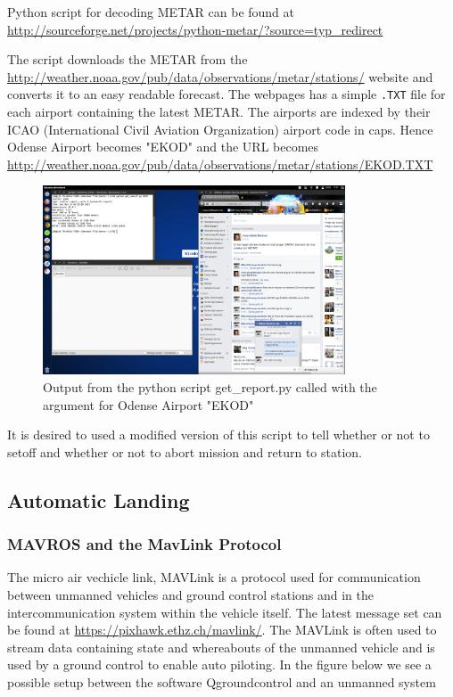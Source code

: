 Python script for decoding METAR can be found at \url{http://sourceforge.net/projects/python-metar/?source=typ_redirect}

The script downloads the METAR from the \url{http://weather.noaa.gov/pub/data/observations/metar/stations/} website and converts it to an easy readable forecast. The webpages has a simple \verb|.TXT| file for each airport containing the latest METAR. The airports are indexed by their ICAO (International Civil Aviation Organization) airport code in caps. Hence Odense Airport becomes "EKOD" and the URL becomes
\url{http://weather.noaa.gov/pub/data/observations/metar/stations/EKOD.TXT}

\begin{figure}
	\centering
	\includegraphics[width=0.8\textwidth, clip=true, trim=1.5cm 21.3cm 35.7cm 0.8cm]{imgs/metar_download}
	\caption{Output from the python script get\_report.py called with the argument for Odense Airport "EKOD"}
\end{figure}
It is desired to used a modified version of this script to tell whether or not to setoff and whether or not to abort mission and return to station.
\subsection{Automatic Landing}
\subsubsection{MAVROS and the MavLink Protocol}

The micro air vechicle link, MAVLink is a protocol used for communication between unmanned vehicles and ground control stations and in the intercommunication system within the vehicle itself. The latest message set can be found at \url{https://pixhawk.ethz.ch/mavlink/}. The MAVLink is often used to stream data containing state and whereabouts of the unmanned vehicle and is used by a ground control to enable auto piloting.
In the figure below we see a possible setup between the software Qgroundcontrol and an unmanned system



